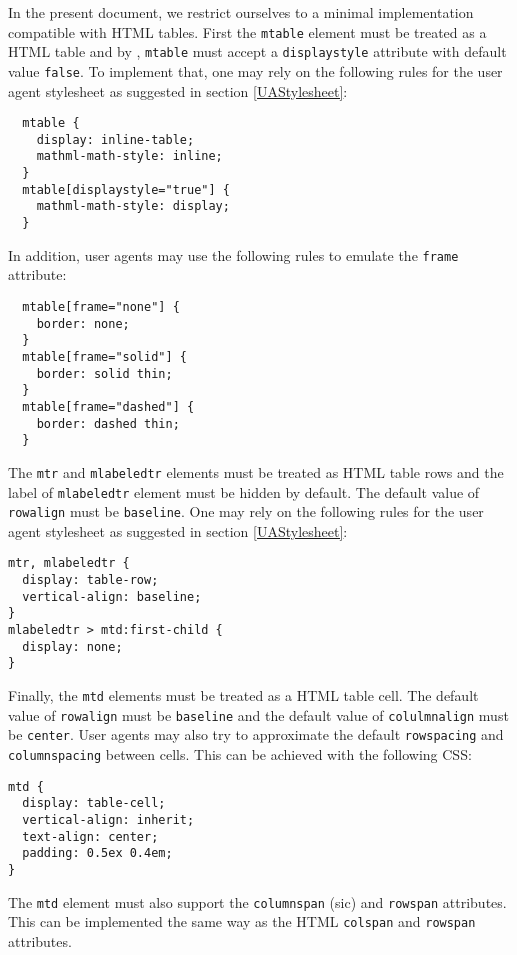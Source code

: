 In the present document, we restrict ourselves to a minimal implementation
compatible with HTML tables. First the {\tt mtable} element must be treated as
a HTML table and by \cite{MathML3}, {\tt mtable} must accept a
{\tt displaystyle} attribute with default value {\tt false}. To implement that,
one may rely on the following rules for the user agent stylesheet as
suggested in section \ref{UAStylesheet}:
%
\begin{lstlisting}
  mtable {
    display: inline-table;
    mathml-math-style: inline;
  }
  mtable[displaystyle="true"] {
    mathml-math-style: display;
  }
\end{lstlisting}
%

In addition, user agents may use the following rules to emulate the {\tt frame}
attribute:
%
\begin{lstlisting}
  mtable[frame="none"] {
    border: none;
  }
  mtable[frame="solid"] {
    border: solid thin;
  }
  mtable[frame="dashed"] {
    border: dashed thin;
  }
\end{lstlisting}
%

The {\tt mtr} and {\tt mlabeledtr} elements must be treated as HTML table rows
and the label of {\tt mlabeledtr} element must be hidden by default.
The default value of {\tt rowalign} must be {\tt baseline}.
One may rely on the following rules for the user agent stylesheet
as suggested in section \ref{UAStylesheet}:

%
\begin{lstlisting}
mtr, mlabeledtr {
  display: table-row;
  vertical-align: baseline;
}
mlabeledtr > mtd:first-child {
  display: none;
}
\end{lstlisting}
%

Finally, the {\tt mtd} elements must be treated as a HTML table cell.
The default value of {\tt rowalign} must be {\tt baseline} and
the default value of {\tt colulmnalign} must be {\tt center}.
User agents may also try to approximate the default {\tt rowspacing} and
{\tt columnspacing} between cells. This can be achieved with the following CSS:

%
\begin{lstlisting}
mtd {
  display: table-cell;
  vertical-align: inherit;
  text-align: center;
  padding: 0.5ex 0.4em;
}
\end{lstlisting}
%

The {\tt mtd} element must also support the {\tt columnspan} (sic) and
{\tt rowspan} attributes. This can be implemented the same way as
the HTML {\tt colspan} and {\tt rowspan} attributes.

